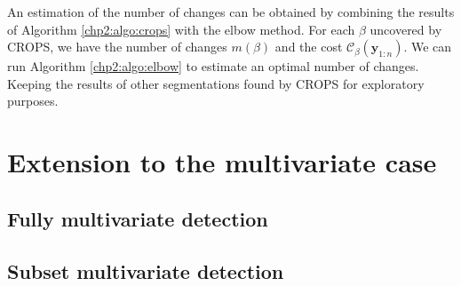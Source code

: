 An estimation of the number of changes can be obtained by combining the results of Algorithm  \ref{chp2:algo:crops} with the elbow method. For each $\beta$ uncovered by CROPS, we have the number of changes $m(\beta)$ and the cost $\mathcal{C}_{\beta}(\bm y_{1:n})$. We can run Algorithm \ref{chp2:algo:elbow} to estimate an optimal number of changes. Keeping the results of other segmentations found by CROPS for exploratory purposes. 

\section{Extension to the multivariate case}

\subsection{Fully multivariate detection}

\subsection{Subset multivariate detection}


